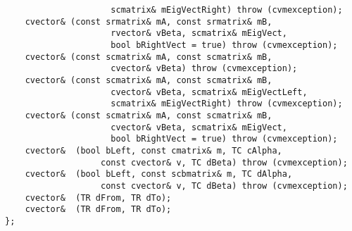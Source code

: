 \verb"                     scmatrix& mEigVectRight) throw (cvmexception);"\\
\verb"    cvector& "\verb"(const srmatrix& mA, const srmatrix& mB,"\\
\verb"                     rvector& vBeta, scmatrix& mEigVect,"\\
\verb"                     bool bRightVect = true) throw (cvmexception);"\\
\verb"    cvector& "\verb"(const scmatrix& mA, const scmatrix& mB,"\\
\verb"                     cvector& vBeta) throw (cvmexception);"\\
\verb"    cvector& "\verb"(const scmatrix& mA, const scmatrix& mB,"\\
\verb"                     cvector& vBeta, scmatrix& mEigVectLeft,"\\
\verb"                     scmatrix& mEigVectRight) throw (cvmexception);"\\
\verb"    cvector& "\verb"(const scmatrix& mA, const scmatrix& mB,"\\
\verb"                     cvector& vBeta, scmatrix& mEigVect,"\\
\verb"                     bool bRightVect = true) throw (cvmexception);"\\
\verb"    cvector& "\verb" (bool bLeft, const cmatrix& m, TC cAlpha,"\\
\verb"                   const cvector& v, TC dBeta) throw (cvmexception);"\\
\verb"    cvector& "\verb" (bool bLeft, const scbmatrix& m, TC dAlpha,"\\
\verb"                   const cvector& v, TC dBeta) throw (cvmexception);"\\
\verb"    cvector& "\verb" (TR dFrom, TR dTo);"\\
\verb"    cvector& "\verb" (TR dFrom, TR dTo);"\\
\verb"};"
\newpage



